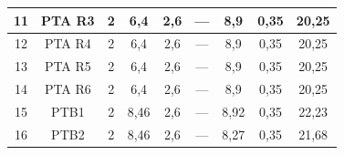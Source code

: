 \documentclass[	DIV=calc,%
							paper=a4,%
							fontsize=12pt,%
							onecolumn]{scrartcl}	 					%
\begin{document}
\begin{tabular}{|c|c|c|c|c|c|c|c|c|}
	11                 & PTA R3             & 2                                                    & 6,4                                         & 2,6                                           & ---                                           & 8,9                                              & 0,35                                            & 20,25                                                             \\ \hline
	12                 & PTA R4             & 2                                                    & 6,4                                         & 2,6                                           & ---                                           & 8,9                                              & 0,35                                            & 20,25                                                             \\ \hline
	13                 & PTA R5             & 2                                                    & 6,4                                         & 2,6                                           & ---                                           & 8,9                                              & 0,35                                            & 20,25                                                             \\ \hline
	14                 & PTA R6             & 2                                                    & 6,4                                         & 2,6                                           & ---                                           & 8,9                                              & 0,35                                            & 20,25                                                             \\ \hline
	15                 & PTB1               & 2                                                    & 8,46                                        & 2,6                                           & ---                                           & 8,92                                             & 0,35                                            & 22,23                                                             \\ \hline
	16                 & PTB2               & 2                                                    & 8,46                                        & 2,6                                           & ---                                           & 8,27                                             & 0,35                                            & 21,68                                                             \\ \hline

\end{tabular}
\end{document}
